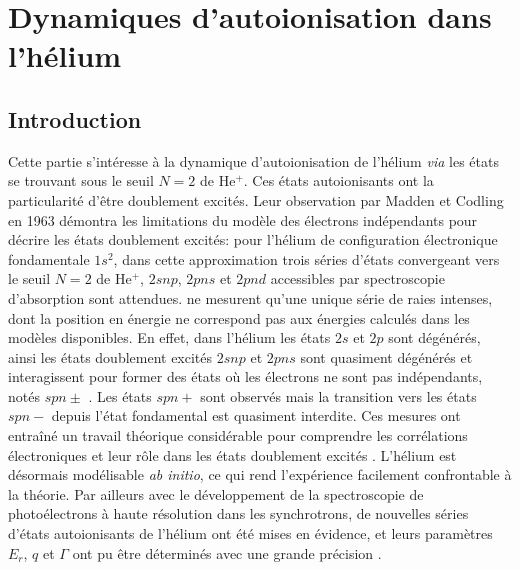 \part{Dynamiques d'autoionisation dans l'hélium}
\label{part:Helium}

\chapter*{Introduction}
Cette partie s'intéresse à la dynamique d'autoionisation de l'hélium \textit{via} les états se trouvant sous le seuil $N=2$ de He$^+$. Ces états autoionisants ont la particularité d'être doublement excités. Leur observation par Madden et Codling en 1963 démontra les limitations du modèle des électrons indépendants pour décrire les états doublement excités: pour l'hélium de configuration électronique fondamentale $1s^2$, dans cette approximation trois séries d'états convergeant vers le seuil $N=2$ de He$^+$, $2snp$, $2pns$ et $2pnd$ accessibles par spectroscopie d'absorption sont attendues.  ne mesurent qu'une unique série de raies intenses, dont la position en énergie ne correspond pas aux énergies calculés dans les modèles disponibles. En effet, dans l'hélium les états $2s$ et $2p$ sont dégénérés, ainsi les états doublement excités $2snp$ et $2pns$ sont quasiment dégénérés et interagissent pour former des états où les électrons ne sont pas indépendants, notés $spn\pm$ . Les états $spn+$ sont observés mais la transition vers les états $spn-$ depuis l'état fondamental est quasiment interdite. Ces mesures ont entraîné un travail théorique considérable pour comprendre les corrélations électroniques et leur rôle dans les états doublement excités . L'hélium est désormais modélisable \textit{ab initio}, ce qui rend l'expérience facilement confrontable à la théorie. Par ailleurs avec le développement de la spectroscopie de photoélectrons à haute résolution dans les synchrotrons, de nouvelles séries d'états autoionisants de l'hélium ont été mises en évidence, et leurs paramètres $E_r$, $q$ et $\Gamma$ ont pu être déterminés avec une grande précision .

